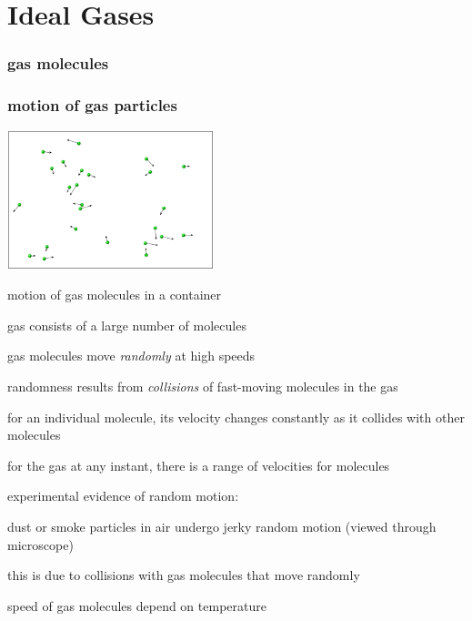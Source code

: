\chapter{Ideal Gases}

\subsection{gas molecules}


\subsection{motion of gas particles} \label{s-gas-intro}

\begin{marginfigure}
	\centering
	
	\vspace*{-20pt}
	
	\includegraphics[width=6cm]{gas-random-motion}
		
	motion of gas molecules in a container
	
\end{marginfigure}

gas consists of a large number of molecules

gas molecules move \emph{randomly} at high speeds

\cmt randomness results from \emph{collisions} of fast-moving molecules in the gas

for an individual molecule, its velocity changes constantly as it collides with other molecules

for the gas at any instant, there is a range of velocities for molecules

\cmt experimental evidence of random motion: 

dust or smoke particles in air undergo jerky random motion (viewed through microscope)

this is due to collisions with gas molecules that move randomly

\cmt speed of gas molecules depend on temperature

